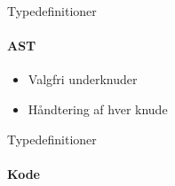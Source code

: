 \begin{frame}{Typedefinitioner}
  \framesubtitle{AST}
  
  \begin{itemize}
    \item Valgfri underknuder 
    \item Håndtering af hver knude 
  \end{itemize}
\end{frame}

\begin{frame}{Typedefinitioner}
  \framesubtitle{Kode}
  \fontsize{7pt}{7.2}\selectfont

\end{frame}


